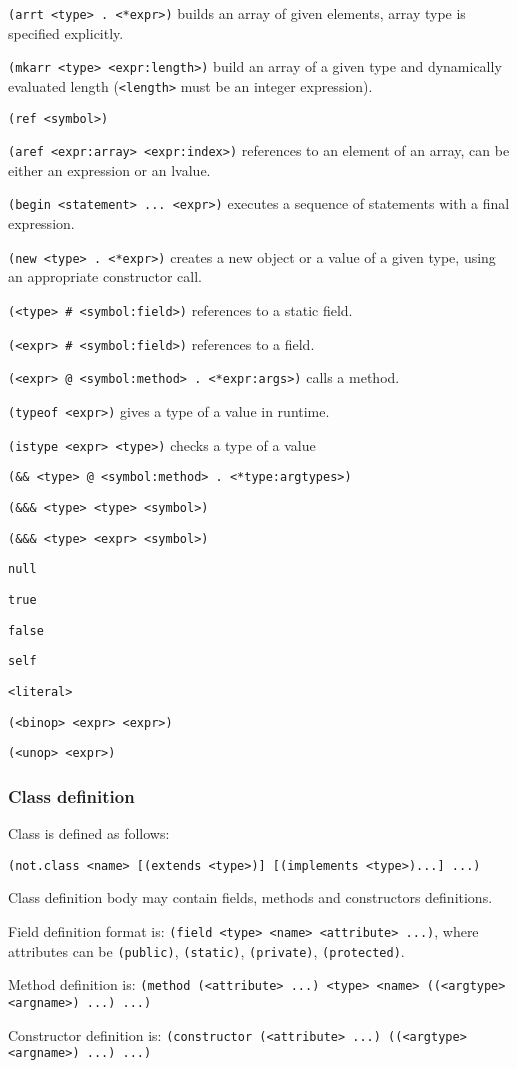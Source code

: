 {\tt (arrt <type> . <*expr>)} builds an array of given elements, array type is
  specified explicitly.

{\tt (mkarr <type> <expr:length>)} build an array of a given type and
   dynamically evaluated length ({\tt <length>} must be an integer expression).

{\tt (ref <symbol>)} 

{\tt (aref <expr:array> <expr:index>)} references to an element of an array, 
 can be either an expression or an lvalue.

{\tt (begin <statement> ... <expr>)} executes a sequence of statements with a final expression.

{\tt (new <type> . <*expr>)} creates a new object or a value of a given type, using an appropriate constructor call.

{\tt (<type> \# <symbol:field>)} references to a static field.

{\tt (<expr> \# <symbol:field>)} references to a field.

{\tt (<expr> @ <symbol:method> . <*expr:args>)} calls a method.

{\tt (typeof <expr>)} gives a type of a value in runtime.

{\tt (istype <expr> <type>)} checks a type of a value

{\tt (\&\& <type> @ <symbol:method> . <*type:argtypes>)}

{\tt (\&\&\& <type> <type> <symbol>)}

{\tt (\&\&\& <type> <expr> <symbol>)}

{\tt null}

{\tt true}

{\tt false}

{\tt self}

{\tt <literal>}

{\tt (<binop> <expr> <expr>)}

{\tt (<unop> <expr>)}


\subsubsection{Class definition}

 Class is defined as follows:

{\tt (not.class <name> [(extends <type>)] [(implements <type>)...] ...)}

Class definition body may contain fields, methods and constructors definitions.

Field definition format is: {\tt (field <type> <name>  <attribute> ...)}, where attributes can be {\tt (public)}, {\tt (static)}, {\tt (private)}, 
      {\tt (protected)}.

Method definition is: 
{\tt (method (<attribute> ...) <type> <name> ((<argtype> <argname>) ...) ...)}

Constructor definition is:
{\tt (constructor (<attribute> ...) ((<argtype> <argname>) ...) ...)}



 
